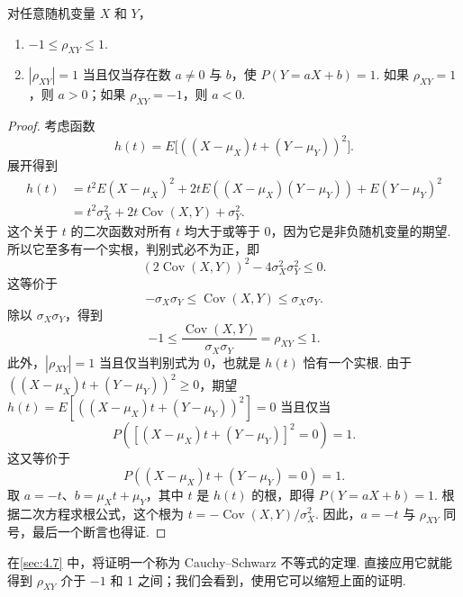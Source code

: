 \begin{theorem}\label{thm:4.5.7}
对任意随机变量 $X$ 和 $Y$，
\begin{enumerate}
\item[(a)] $-1\le\rho_{XY}\le1$.
\item[(b)] $|\rho_{XY}|=1$ 当且仅当存在数 $a\ne0$ 与 $b$，使 $P(Y=aX+b)=1$. 如果 $\rho_{XY}=1$，则 $a>0$；如果 $\rho_{XY}=-1$，则 $a<0$.
\end{enumerate}
\end{theorem}
\begin{proof}
考虑函数
$$h(t)=E\bigl[((X-\mu_X)t+(Y-\mu_Y))^2\bigr].$$
展开得到
$$\begin{aligned}
h(t)&=t^2E(X-\mu_X)^2+2tE((X-\mu_X)(Y-\mu_Y))+E(Y-\mu_Y)^2\\
&=t^2\sigma_X^2+2t\operatorname{Cov}(X,Y)+\sigma_Y^2.
\end{aligned}$$
这个关于 $t$ 的二次函数对所有 $t$ 均大于或等于 0，因为它是非负随机变量的期望. 所以它至多有一个实根，判别式必不为正，即
$$(2\operatorname{Cov}(X,Y))^2-4\sigma_X^2\sigma_Y^2\le0.$$
这等价于
$$-\sigma_X\sigma_Y\le\operatorname{Cov}(X,Y)\le\sigma_X\sigma_Y.$$
除以 $\sigma_X\sigma_Y$，得到
$$-1\le\frac{\operatorname{Cov}(X,Y)}{\sigma_X\sigma_Y}=\rho_{XY}\le1.$$
此外，$|\rho_{XY}|=1$ 当且仅当判别式为 0，也就是 $h(t)$ 恰有一个实根. 由于 $((X-\mu_X)t+(Y-\mu_Y))^2\ge0$，期望 $h(t)=E[((X-\mu_X)t+(Y-\mu_Y))^2]=0$ 当且仅当
$$P([(X-\mu_X)t+(Y-\mu_Y)]^2=0)=1.$$
这又等价于
$$P((X-\mu_X)t+(Y-\mu_Y)=0)=1.$$
取 $a=-t$、$b=\mu_Xt+\mu_Y$，其中 $t$ 是 $h(t)$ 的根，即得 $P(Y=aX+b)=1$. 根据二次方程求根公式，这个根为 $t=-\operatorname{Cov}(X,Y)/\sigma_X^2$. 因此，$a=-t$ 与 $\rho_{XY}$ 同号，最后一个断言也得证.
\end{proof}
在\autoref{sec:4.7} 中，将证明一个称为 Cauchy--Schwarz 不等式的定理. 直接应用它就能得到 $\rho_{XY}$ 介于 $-1$ 和 1 之间；我们会看到，使用它可以缩短上面的证明.

